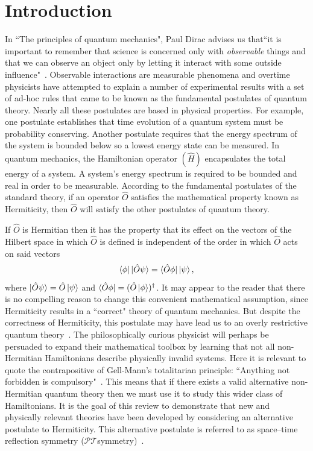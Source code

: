 \documentclass[12pt, a4paper]{report}
\newcommand\PT{\(\mathcal{PT}\)}
\begin{document}
\chapter{Introduction}\label{Introduction}
In ``The principles of quantum mechanics", Paul Dirac advises us that``it is important to remember that science is concerned only with \textit{observable} things and that we can observe an object only by letting it interact with some outside influence"~\cite{POQM}. Observable interactions are measurable phenomena and overtime physicists have attempted to explain a number of experimental results with a set of ad-hoc rules that came to be known as the fundamental postulates of quantum theory. Nearly all these postulates are based in physical properties. For example, one postulate establishes that time evolution of a quantum system must be probability conserving. Another postulate requires that the energy spectrum of the system is bounded below so a lowest energy state can be measured. In quantum mechanics, the Hamiltonian operator $(\hat{H})$ encapsulates the total energy of a system. A system's energy spectrum is required to be bounded and real in order to be measurable. According to the fundamental postulates of the standard theory, if an operator $\hat{O}$ satisfies the mathematical property known as Hermiticity, then $\hat{O}$ will satisfy the other postulates of quantum theory.

If $\hat{O}$ is Hermitian then it has the property that its effect on the vectors of the Hilbert space in which $\hat{O}$ is defined is independent of the order in which $\hat{O}$ acts on said vectors~\cite{Jones-Smith}
\begin{equation}\label{eq:1.1}
\bra{\phi}\ket{\hat{O}\psi} = \bra{\hat{O}\phi}\ket{\psi},
\end{equation}
where $\ket{\hat{O}\psi} = \hat{O}\ket{\psi}$ and $\bra{\hat{O}\phi} = (\hat{O}\ket{\phi})^{\dagger}$. It may appear to the reader that there is no compelling reason to change this convenient mathematical assumption, since Hermiticity results in a ``correct" theory of quantum mechanics. But despite the correctness of Hermiticity, this postulate may have lead us to an overly restrictive quantum theory~\cite{MustaHbeHermitian}. The philosophically curious physicist will perhaps be persuaded to expand their mathematical toolbox by learning that not all non-Hermitian Hamiltonians describe physically invalid systems. Here it is relevant to quote the contrapositive of Gell-Mann's totalitarian principle: ``Anything not forbidden is compulsory"~\cite{MGM}. This means that if there exists a valid alternative non-Hermitian quantum theory then we must use it to study this wider class of Hamiltonians.
It is the goal of this review to demonstrate that new and physically relevant theories have been developed by considering an alternative postulate to Hermiticity. This alternative postulate is referred to as space–time reflection symmetry (\PT\:symmetry)~\cite{MustaHbeHermitian}. 
\end{document}
